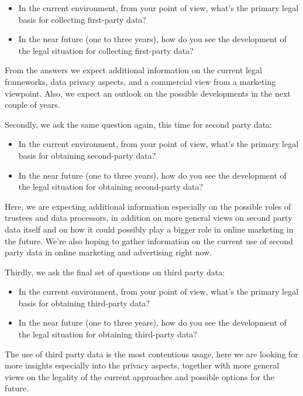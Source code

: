 \begin{itemize}
 \item In the current environment, from your point of view, what's the primary legal basis for collecting first-party data?
 \item In the near future (one to three years), how do you see the development of the legal situation for collecting first-party data?
\end{itemize}
 
From the answers we expect additional information on the current legal frameworks, data privacy aspects, and a commercial view from a marketing viewpoint. Also, we expect an outlook on the possible developments in the next couple of years.
 
Secondly, we ask the same question again, this time for second party data:

\begin{itemize} 
 \item In the current environment, from your point of view, what's the primary legal basis for obtaining second-party data?
 \item In the near future (one to three years), how do you see the development of the legal situation for obtaining second-party data?
\end{itemize}

Here, we are expecting additional information especially on the possible roles of trustees and data processors, in addition on more general views on second party data itself and on how it could possibly play a bigger role in online marketing in the future. We're also hoping to gather information on the current use of second party data in online marketing and advertising right now.
 
Thirdly, we ask the final set of questions on third party data:

\begin{itemize} 
 \item In the current environment, from your point of view, what's the primary legal basis for obtaining third-party data?
 \item In the near future (one to three years), how do you see the development of the legal situation for obtaining third-party data?
\end{itemize} 
 
The use of third party data is the most contentious usage, here we are looking for more insights especially into the privacy aspects, together with more general views on the legality of the current approaches and possible options for the future.

